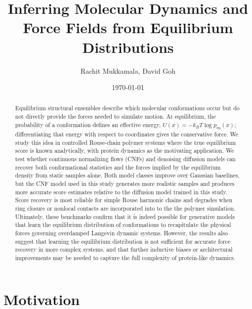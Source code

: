 \documentclass[reprint,amsmath,amssymb,aps,pra,10pt]{revtex4-2}
\begin{document}
\title{Inferring Molecular Dynamics and Force Fields from Equilibrium Distributions}

\author{Rachit Mukkamala, David Goh}

\date{\today}

\begin{abstract}
Equilibrium structural ensembles describe which molecular conformations occur but do not directly provide the forces needed to simulate motion.
At equilibrium, the probability of a conformation defines an effective energy, $U(x)=-k_B T\log p_{\mathrm{eq}}(x)$; differentiating that energy with respect to coordinates gives the conservative force.
We study this idea in controlled Rouse-chain polymer systems where the true equilibrium score is known analytically, with protein dynamics as the motivating application.
We test whether continuous normalizing flows (CNFs) and denoising diffusion models can recover both conformational statistics and the forces implied by the equilibrium density from static samples alone.
Both model classes improve over Gaussian baselines, but the CNF model used in this study generates more realistic samples and produces more accurate score estimates relative to the diffusion model trained in this study.
Score recovery is most reliable for simple Rouse harmonic chains and degrades when ring closure or nonlocal contacts are incorporated into to the the polymer simulation.
Ultimately, these benchmarks confirm that it is indeed possible for generative models that learn the equilibrium distribution of conformations to recapitulate the physical forces governing overdamped Langevin dynamic systems.
However, the results also suggest that learning the equilibrium distribution is not sufficient for accurate force recovery in more complex systems, and that further inductive biases or architectural improvements may be needed to capture the full complexity of protein-like dynamics.
\end{abstract}

\maketitle

\section{Motivation}
\end{document}
